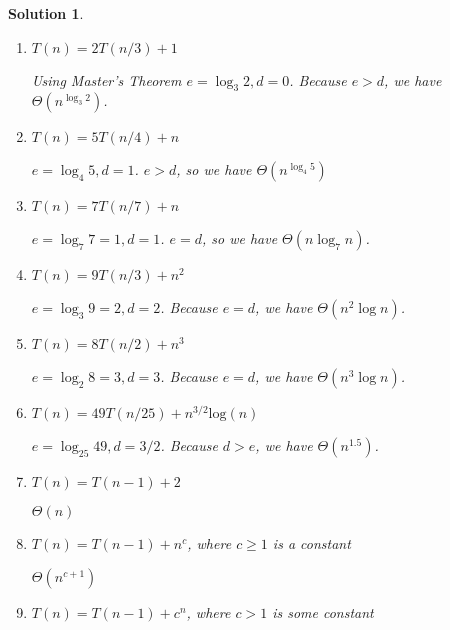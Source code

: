 \documentclass[boxes]{rutgers_hw}
\newtheorem*{solutions}{Solution}
\begin{document}
\begin{exern}{2.5}
\end{exern}
\begin{solutions}
    \begin{enumerate}
        \item $T(n) = 2T(n/3) + 1$
        \begin{solution}
            Using Master's Theorem $e = \log_{3}{2}, d = 0$. Because $e > d$, we have $\Theta(n^{\log_{3}{2}})$.
        \end{solution}
        \item $T(n) = 5T(n/4) + n$
        \begin{solution}
            $e = \log_{4}{5}, d = 1$. $e > d$, so we have $\Theta(n^{\log_{4}{5}})$
        \end{solution}
        \item $T(n) = 7T(n/7) + n$
        \begin{solution}
            $e = \log_{7}{7} = 1, d = 1$. $e = d$, so we have $\Theta(n\log_{7}{n})$.
        \end{solution}
        \item $T(n) = 9T(n/3) + n^{2}$
        \begin{solution}
            $e = \log_{3}{9} = 2, d = 2$. Because $e = d$, we have $\Theta(n^{2}\log{n})$.
        \end{solution}
        \item $T(n) = 8T(n/2) + n^{3}$
        \begin{solution}
            $e = \log_{2}{8} = 3, d = 3$. Because $e = d$, we have $\Theta(n^{3}\log{n})$.
        \end{solution}
        \item $T(n) = 49T(n/25) + n^{3/2}\text{log}(n)$
        \begin{solution}
            $e = \log_{25}{49}, d = 3/2$. Because $d > e$, we have $\Theta(n^{1.5})$.
        \end{solution}
        \item $T(n) = T(n - 1) + 2$
        \begin{solution}
            $\Theta(n)$
        \end{solution}
        \item $T(n) = T(n - 1) + n^{c}$, where $c \geq 1$ is a constant
        \begin{solution}
            $\Theta(n^{c+1})$
        \end{solution}
        \item $T(n) = T(n - 1) + c^{n}$, where $c > 1$ is some constant

\end{enumerate}
\end{solutions}
\end{document}
